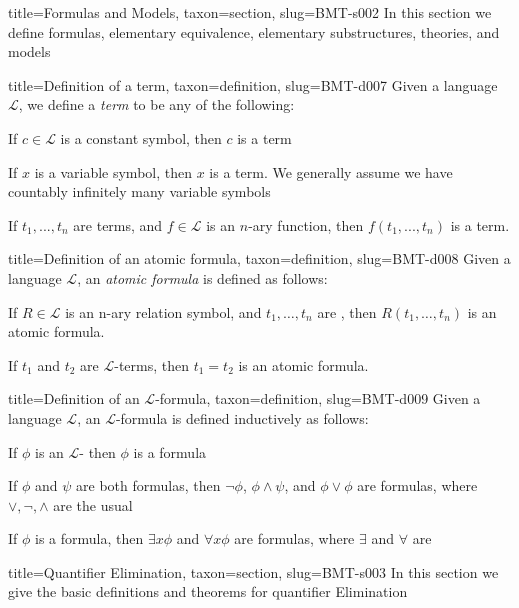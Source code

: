 \documentclass[a4paper]{article}
\begin{document}
\begin{tree}{title={Formulas and Models}, taxon={section}, slug={BMT-s002}}
In this section we define formulas, elementary equivalence, elementary substructures, theories, and models
\begin{tree}{title={Definition of a term}, taxon={definition}, slug={BMT-d007}}
Given a language \(\mathcal {L}\), we define a \emph{term} to be any of the following:\par{If \(c \in   \mathcal {L}\) is a constant symbol, then \(c\) is a term}\par{If \(x\) is a variable symbol, then \(x\) is a term. We generally assume we have countably infinitely many variable symbols}\par{If \(t_1,..., t_n\) are terms, and \(f \in   \mathcal {L}\) is an \(n\)-ary function, then \(f(t_1,..., t_n)\) is a term.}
\end{tree}

\begin{tree}{title={Definition of an atomic formula}, taxon={definition}, slug={BMT-d008}}
Given a language \(\mathcal {L}\), an \emph{atomic formula} is defined as follows:\par{If \(R \in   \mathcal {L}\) is an n-ary relation symbol, and \(t_1, \dots , t_n\) are , then \(R(t_1, \dots , t_n)\) is an atomic formula.}\par{If \(t_1\) and \(t_2\) are \(\mathcal {L}\)-terms, then \(t_1 = t_2\) is an atomic formula. }
\end{tree}

\begin{tree}{title={Definition of an \(\mathcal {L}\)-formula}, taxon={definition}, slug={BMT-d009}}
Given a language \(\mathcal {L}\), an \(\mathcal {L}\)-formula is defined inductively as follows:\par{If \(\phi\) is an \(\mathcal {L}\)- then \(\phi\) is a formula}\par{If \(\phi\) and \(\psi\) are both formulas, then \(\neg \phi\), \(\phi   \land   \psi\), and \(\phi \lor \phi\) are formulas, where \(\lor , \neg , \land\) are the usual }\par{If \(\phi\) is a formula, then \(\exists  x  \phi\) and \(\forall  x  \phi\) are formulas, where \(\exists\) and \(\forall\) are }
\end{tree}

\end{tree}

\begin{tree}{title={Quantifier Elimination}, taxon={section}, slug={BMT-s003}}
In this section we give the basic definitions and theorems for quantifier Elimination
\end{tree}

\printbibliography
\end{document}
